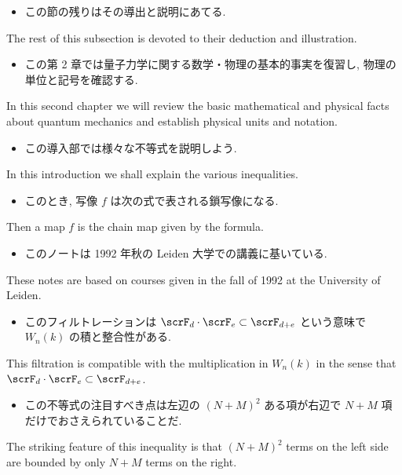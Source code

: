 \documentclass[openany, a4paper, oneside]{jsbook}
\begin{document}
\begin{itemize}
\item この節の残りはその導出と説明にあてる.
\end{itemize}
The rest of this subsection is devoted to their deduction and illustration.

\begin{itemize}
\item この第 2 章では量子力学に関する数学・物理の基本的事実を復習し, 物理の単位と記号を確認する.  \cite{LiebSeiringer1}
\end{itemize}
In this second chapter we will review the basic mathematical and physical facts
about quantum mechanics and establish physical units and notation.

\begin{itemize}
\item この導入部では様々な不等式を説明しよう. \cite{LiebSeiringer1}
\end{itemize}
In this introduction we shall explain the various inequalities.

\begin{itemize}
\item このとき, 写像 $f$ は次の式で表される鎖写像になる. \cite{CharlesWeibel1}
\end{itemize}
Then a map $f$ is the chain map given by the formula.

\begin{itemize}
\item このノートは 1992 年秋の Leiden 大学での講義に基いている. \cite{ChrisPeters1}
\end{itemize}
These notes are based on courses given in the fall of 1992 at the University of Leiden.

\begin{itemize}
\item このフィルトレーションは $\scrF_d \cdot \scrF_e \subset \scrF_{d+e}$ という意味で $W_n(k)$ の積と整合性がある.
\end{itemize}
This filtration is compatible with the multiplication in $W_n(k)$
in the sense that $\scrF_d \cdot \scrF_e \subset \scrF_{d+e}$.

\begin{itemize}
\item この不等式の注目すべき点は左辺の $(N+M)^2$ ある項が右辺で $N+M$ 項だけでおさえられていることだ. \cite{LiebSeiringer1}
\end{itemize}
The striking feature of this inequality is that $(N+M)^2$ terms on the left side are bounded
by only $N+M$ terms on the right.
\end{document}
